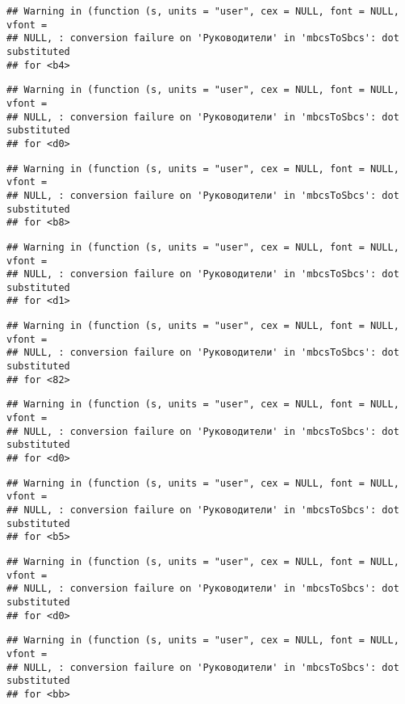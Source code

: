 \documentclass[
]{article}
\begin{document}
\begin{verbatim}
## Warning in (function (s, units = "user", cex = NULL, font = NULL, vfont =
## NULL, : conversion failure on 'Руководители' in 'mbcsToSbcs': dot substituted
## for <b4>
\end{verbatim}

\begin{verbatim}
## Warning in (function (s, units = "user", cex = NULL, font = NULL, vfont =
## NULL, : conversion failure on 'Руководители' in 'mbcsToSbcs': dot substituted
## for <d0>
\end{verbatim}

\begin{verbatim}
## Warning in (function (s, units = "user", cex = NULL, font = NULL, vfont =
## NULL, : conversion failure on 'Руководители' in 'mbcsToSbcs': dot substituted
## for <b8>
\end{verbatim}

\begin{verbatim}
## Warning in (function (s, units = "user", cex = NULL, font = NULL, vfont =
## NULL, : conversion failure on 'Руководители' in 'mbcsToSbcs': dot substituted
## for <d1>
\end{verbatim}

\begin{verbatim}
## Warning in (function (s, units = "user", cex = NULL, font = NULL, vfont =
## NULL, : conversion failure on 'Руководители' in 'mbcsToSbcs': dot substituted
## for <82>
\end{verbatim}

\begin{verbatim}
## Warning in (function (s, units = "user", cex = NULL, font = NULL, vfont =
## NULL, : conversion failure on 'Руководители' in 'mbcsToSbcs': dot substituted
## for <d0>
\end{verbatim}

\begin{verbatim}
## Warning in (function (s, units = "user", cex = NULL, font = NULL, vfont =
## NULL, : conversion failure on 'Руководители' in 'mbcsToSbcs': dot substituted
## for <b5>
\end{verbatim}

\begin{verbatim}
## Warning in (function (s, units = "user", cex = NULL, font = NULL, vfont =
## NULL, : conversion failure on 'Руководители' in 'mbcsToSbcs': dot substituted
## for <d0>
\end{verbatim}

\begin{verbatim}
## Warning in (function (s, units = "user", cex = NULL, font = NULL, vfont =
## NULL, : conversion failure on 'Руководители' in 'mbcsToSbcs': dot substituted
## for <bb>
\end{verbatim}
\end{document}
